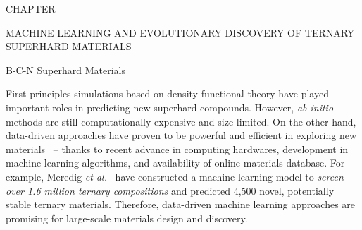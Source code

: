




    
    
    \addtocounter{numch}{1}
	{\centering
		\vspace{0pt} \hspace{0pt} \par
	}
	{\centering
		\vspace{56pt} CHAPTER  \the\value{numch}
	}
	{\centering\singlespacing
		MACHINE LEARNING AND EVOLUTIONARY DISCOVERY OF TERNARY SUPERHARD MATERIALS
	    \par
	}
	{\centering
		\vspace{0pt} \hspace{0pt} \par
	}
	
		
	
	
	
	{\centering
		\vspace{12pt} B-C-N Superhard Materials \\
	    \par
	}



	
	
	
		First-principles simulations based on density functional theory have played important roles in predicting new superhard compounds.
	However, {\it ab initio} methods are still computationally expensive and size-limited.
	On the other hand, data-driven approaches have proven to be powerful and efficient in exploring new materials~\cite{schmidt2019recent, zhou2019big, himanen2019data,chibani2020machine,saal2020machine,cai2020machine} -- thanks to recent advance in computing hardwares, development in machine learning algorithms, and availability of online materials database.
	For example, Meredig {\it et al.}~\cite{meredig2014combinatorial} have constructed a machine learning model to {\it screen over 1.6 million ternary compositions} and predicted 4,500 novel, potentially stable ternary materials.
	Therefore, data-driven machine learning approaches are promising for large-scale materials design and discovery.
	
